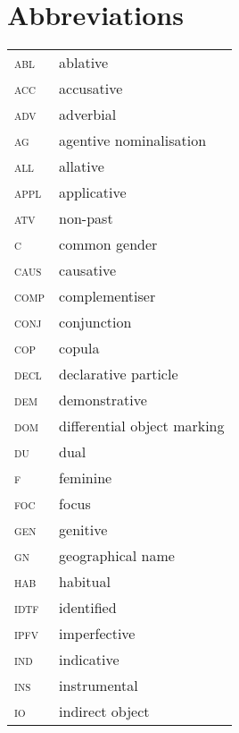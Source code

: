 \documentclass[output=paper]{LSP/langsci}
\begin{document}
\section*{Abbreviations}
\begin{tabularx}{.45\textwidth}{lQ}
\textsc{abl} & ablative\\
\textsc{acc} & accusative\\
\textsc{adv} & adverbial\\
\textsc{ag} & agentive nominalisation\\
\textsc{all} & allative\\
\textsc{appl} & applicative\\
\textsc{atv} & non-past \\
\textsc{c} & common gender\\
\textsc{caus} & causative\\
\textsc{comp} & complementiser\\
\textsc{conj} & conjunction\\
\textsc{cop} & copula\\
\textsc{decl} & declarative particle\\
\textsc{dem} & demonstrative\\
\textsc{dom} & differential object marking\\
\textsc{du} & dual\\
\textsc{f} & feminine\\
\textsc{foc} & focus\\
\textsc{gen} & genitive\\
\textsc{gn}  & geographical name\\
\textsc{hab} & habitual\\
\textsc{idtf}  & identified\\
\textsc{ipfv} & imperfective\\
\textsc{ind} & indicative\\
\textsc{ins} & instrumental\\
\textsc{io}  & {indirect object}\\ 
\end{tabularx}
\end{document}
